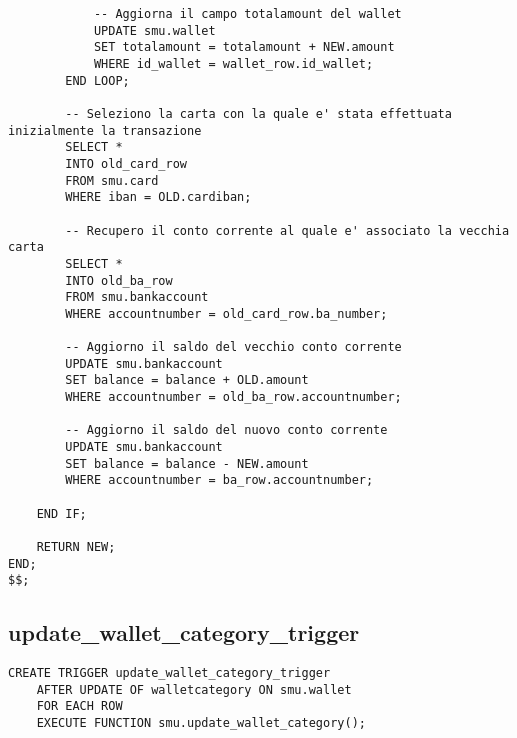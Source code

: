 \begin{lstlisting}
            -- Aggiorna il campo totalamount del wallet
            UPDATE smu.wallet
            SET totalamount = totalamount + NEW.amount
            WHERE id_wallet = wallet_row.id_wallet;
        END LOOP;        

        -- Seleziono la carta con la quale e' stata effettuata inizialmente la transazione
        SELECT *
        INTO old_card_row
        FROM smu.card
        WHERE iban = OLD.cardiban;

        -- Recupero il conto corrente al quale e' associato la vecchia carta
        SELECT *
        INTO old_ba_row
        FROM smu.bankaccount
        WHERE accountnumber = old_card_row.ba_number;

        -- Aggiorno il saldo del vecchio conto corrente
        UPDATE smu.bankaccount
        SET balance = balance + OLD.amount
        WHERE accountnumber = old_ba_row.accountnumber;

        -- Aggiorno il saldo del nuovo conto corrente
        UPDATE smu.bankaccount
        SET balance = balance - NEW.amount
        WHERE accountnumber = ba_row.accountnumber;

    END IF;

    RETURN NEW;
END;
$$;
\end{lstlisting}

\subsection{update\_wallet\_category\_trigger}

\begin{lstlisting}
CREATE TRIGGER update_wallet_category_trigger
    AFTER UPDATE OF walletcategory ON smu.wallet
    FOR EACH ROW
    EXECUTE FUNCTION smu.update_wallet_category();
\end{lstlisting}

